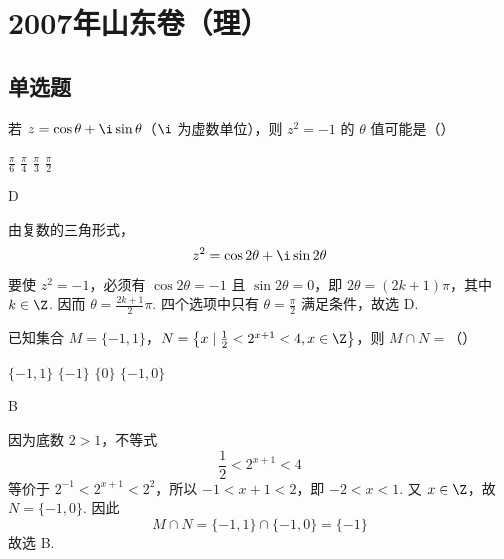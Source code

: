 \chapter{2007年山东卷（理）}

\section{单选题}

\begin{problem}
若 \(z = \cos \theta + \i \sin \theta\)（\(\i\) 为虚数单位），则 \(z^2 = -1\) 的 \(\theta\) 值可能是（\quad）

\choices
    {\(\frac{\pi}{6}\)}
    {\( \frac{\pi}{4} \)}
    {\( \frac{\pi}{3} \)}
    {\( \frac{\pi}{2} \)}

\begin{answer}D\end{answer}

\begin{solution}
由复数的三角形式，
\[
z^2=\cos 2\theta+\i\sin 2\theta
\]
要使 \(z^2=-1\)，必须有 \(\cos 2\theta=-1\) 且 \(\sin 2\theta=0\)，即 \(2\theta=(2k+1)\pi\)，其中 \(k\in\Z\). 因而 \(\theta=\frac{2k+1}{2}\pi\). 四个选项中只有 \(\theta=\frac{\pi}{2}\) 满足条件，故选 D.
\end{solution}
\end{problem}

\begin{problem}
已知集合 \(M = \{-1, 1\}\)，\(N = \left\{x \mid \frac{1}{2} < 2^{x+1} < 4, x \in \Z\right\}\)，则 \(M \cap N =\)（\quad）

\choices
    {\(\{-1, 1\}\)}
    {\(\{-1\}\)}
    {\( \{0\} \)}
    {\(\{-1,0\}\)}

\begin{answer}B\end{answer}

\begin{solution}
因为底数 \(2>1\)，不等式
\[
\frac{1}{2}<2^{x+1}<4
\]
等价于 \(2^{-1}<2^{x+1}<2^2\)，所以 \(-1<x+1<2\)，即 \(-2<x<1\). 又 \(x\in\Z\)，故 \(N=\{-1,0\}\). 因此
\[
M\cap N=\{-1,1\}\cap\{-1,0\}=\{-1\}
\]
故选 B.
\end{solution}
\end{problem}

